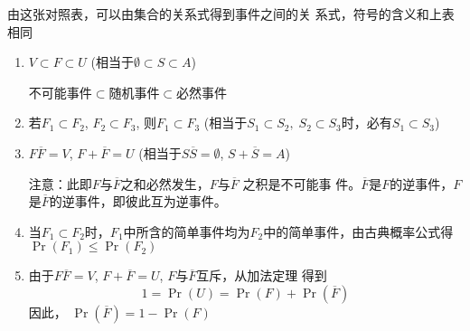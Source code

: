 由这张对照表，可以由集合的关系式得到事件之间的关
系式，符号的含义和上表相同
\begin{enumerate}
\item $V\subset F\subset U$ (相当于$\emptyset\subset S\subset A$) 

不可能事件$\subset$随机事件$\subset$必然事件
\item 若$F_1\subset F_2$, $F_2\subset F_3$, 则$F_1\subset F_3$
(相当于$S_1\subset S_2,\; S_2\subset S_3$时，必有$S_1\subset S_3$)
\item $F\overline {F}= V$, $F+ \overline {F}= U$ (相当于$S\overline{S} = \emptyset$, $S+ \overline{S} = A$) 

注意：此即$F$与$\overline F$之和必然发生，$F$与$\overline{F}$ 之积是不可能事
件。$\overline{F}$是$F$的逆事件，$F$是$\overline{F}$的逆事件，即彼此互为逆事件。
\item 当$F_1\subset F_2$时，$F_1$中所含的简单事件均为$F_2$中的简单事件，由古典概率公式得
$\Pr\left(F_{1}\right)\le  \Pr\left(F_{2}\right)$
\item 由于$F\overline{F}= V$, $F+ \overline {F}= U$, $F$与$\overline{F}$互斥，从加法定理
得到
$$1=\Pr(U)=\Pr(F)+\Pr(\overline{F})$$
因此，
$\Pr(\overline{F})=1-\Pr\left(F\right)$
\end{enumerate}

